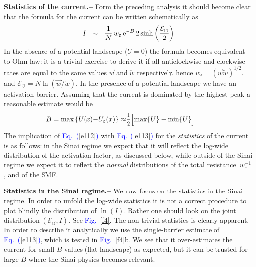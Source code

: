 \documentclass[aps,prl,floats,floatfix,twocolumn]{revtex4}
\newcommand{\eexp}{\mbox{e}^}
\newcommand{\mylabel}[1]{\label{#1}}
\newcommand{\eeq}{\end{eqnarray}}
\newcommand{\be}[1]{\begin{eqnarray}\ifthenelse{#1=-1}
{\nonumber}{\ifthenelse{#1=0}{}{\mylabel{e#1}}}}
\newcommand{\sect}[1]{{\bf #1.-- }}
\newcommand{\Eq}[1]{\textcolor{blue}{Eq.\!\!~(\ref{#1})}}
\newcommand{\Fig}[1]{\textcolor{blue}{Fig.}\!\!~\ref{#1}}
\begin{document}
\sect{Statistics of the current}
%
%
Form the preceding analysis it should become clear that 
the formula for the current can be written schematically as 
%
\be{112}
I \ \ \sim \ \  \frac{1}{N} \, w_{\varepsilon} \, \eexp{-B} \, 2\sinh\left(\frac{\mathcal{E}_{\circlearrowleft}}{2}\right)
\eeq
%
In the absence of a potential landscape ($U=0$) the formula becomes equivalent to Ohm law: 
it is a trivial exercise to derive it if all anticlockwise and clockwise rates are equal 
to the same values $\overrightarrow{w}$ and $\overleftarrow{w}$ respectively, 
hence $w_{\epsilon}=(\overrightarrow{w} \overleftarrow{w})^{1/2}$, 
and ${\mathcal{E}_{\circlearrowleft}=N\ln(\overrightarrow{w}/\overleftarrow{w})}$.   
In the presence of a potential landscape we have an activation barrier.
Assuming that the current is dominated by the highest peak 
a reasonable estimate would be
%
\be{113}
B = \text{max}\left\{ U(x){-}U_{\varepsilon}(x) \right\} 
\approx& \frac{1}{2} \Big[ \text{max}\{U\} - \text{min}\{U\} \Big] \ \ \ \ 
\eeq 
%
The implication of \Eq{e112} with \Eq{e113} for the {\em statistics} of the current 
is as follows: in the Sinai regime we expect that it will reflect 
the log-wide distribution of the activation factor, as discussed below, 
while outside of the Sinai regime we expect it to reflect the {\em normal} distributions 
of the total resistance~$w_{\varepsilon}^{-1}$, and of the SMF.  


\sect{Statistics in the Sinai regime}
%
We now focus on the statistics in the Sinai regime. 
In order to unfold the log-wide statistics it is 
not a correct procedure to plot blindly the distribution 
of $\ln(I)$. Rather one should look on the joint 
distribution ${(\mathcal{E}_{\circlearrowleft},I)}$. 
See \Fig{f4}. The non-trivial statistics is clearly apparent.
In order to describe it analytically we use 
the single-barrier estimate of \Eq{e113}, 
which is tested in \Fig{f4}b. We see that it 
over-estimates the current for small $B$ values 
(flat landscape) as expected, but it can be trusted 
for large $B$ where the Sinai physics becomes relevant. 
\end{document}
